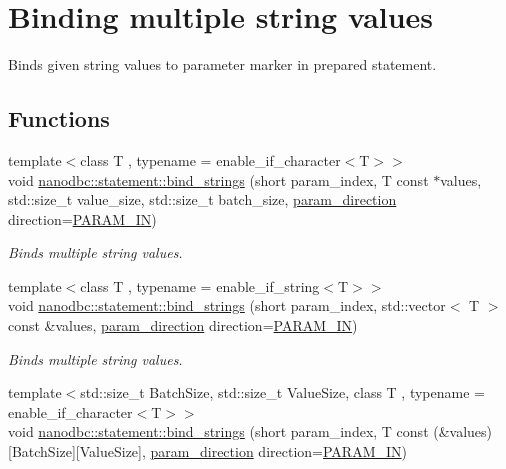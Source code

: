 \hypertarget{group__bind__strings}{}\section{Binding multiple string values}
\label{group__bind__strings}


Binds given string values to parameter marker in prepared statement.  


\subsection*{Functions}
\begin{DoxyCompactItemize}
\item 
{\footnotesize template$<$class T , typename  = enable\+\_\+if\+\_\+character$<$\+T$>$$>$ }\\void \mbox{\hyperlink{group__bind__strings_ga8914c229f28ee7b02cf1b85684741326}{nanodbc\+::statement\+::bind\+\_\+strings}} (short param\+\_\+index, T const $\ast$values, std\+::size\+\_\+t value\+\_\+size, std\+::size\+\_\+t batch\+\_\+size, \mbox{\hyperlink{classnanodbc_1_1statement_a523142f53cbbee8d68a074da993e7fa6}{param\+\_\+direction}} direction=\mbox{\hyperlink{classnanodbc_1_1statement_a523142f53cbbee8d68a074da993e7fa6ae33f42ce0677d00c291ff4d8e39f99de}{P\+A\+R\+A\+M\+\_\+\+IN}})
\begin{DoxyCompactList}\small\item\em Binds multiple string values. \end{DoxyCompactList}\item 
{\footnotesize template$<$class T , typename  = enable\+\_\+if\+\_\+string$<$\+T$>$$>$ }\\void \mbox{\hyperlink{group__bind__strings_gaecd4578e6c204ffb15203e743a4ffdba}{nanodbc\+::statement\+::bind\+\_\+strings}} (short param\+\_\+index, std\+::vector$<$ T $>$ const \&values, \mbox{\hyperlink{classnanodbc_1_1statement_a523142f53cbbee8d68a074da993e7fa6}{param\+\_\+direction}} direction=\mbox{\hyperlink{classnanodbc_1_1statement_a523142f53cbbee8d68a074da993e7fa6ae33f42ce0677d00c291ff4d8e39f99de}{P\+A\+R\+A\+M\+\_\+\+IN}})
\begin{DoxyCompactList}\small\item\em Binds multiple string values. \end{DoxyCompactList}\item 
{\footnotesize template$<$std\+::size\+\_\+t Batch\+Size, std\+::size\+\_\+t Value\+Size, class T , typename  = enable\+\_\+if\+\_\+character$<$\+T$>$$>$ }\\void \mbox{\hyperlink{group__bind__strings_ga979e2bdbe4d7b3a6845112a306735a3e}{nanodbc\+::statement\+::bind\+\_\+strings}} (short param\+\_\+index, T const (\&values)\mbox{[}Batch\+Size\mbox{]}\mbox{[}Value\+Size\mbox{]}, \mbox{\hyperlink{classnanodbc_1_1statement_a523142f53cbbee8d68a074da993e7fa6}{param\+\_\+direction}} direction=\mbox{\hyperlink{classnanodbc_1_1statement_a523142f53cbbee8d68a074da993e7fa6ae33f42ce0677d00c291ff4d8e39f99de}{P\+A\+R\+A\+M\+\_\+\+IN}})

\end{DoxyCompactItemize}
